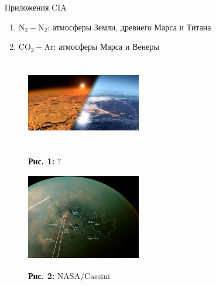 \documentclass[10pt,usenames,pdf,hyperref={unicode},dvipsnames]{beamer}
\newcommand{\mycaption}[2]{
    \textbf{#1:} #2
}
\begin{document}
\begin{frame}{Приложения CIA}
    \vspace*{-0.1cm}
\begin{enumerate}
    \item N$_2-$N$_2$: атмосферы Земли, древнего Марса  и Титана \\
    \item CO$_2-$Ar: атмосферы Марса и Венеры  \\
\end{enumerate}

\begin{minipage}{0.49\linewidth}
\begin{figure}[H]
    \vspace{0.4cm}
    \includegraphics[width=5.0cm, height=3.8cm]{./pictures/early_mars.jpeg}
    \mycaption{Рис. 1}{?}
\end{figure}
\end{minipage}
\begin{minipage}{0.5\linewidth}
\begin{figure}[H]
    \includegraphics[width=5.0cm, height=3.8cm]{./pictures/titan.jpg}
    \mycaption{Рис. 2}{NASA/Cassini}
\end{figure}
\end{minipage}
\end{frame}
\end{document}
